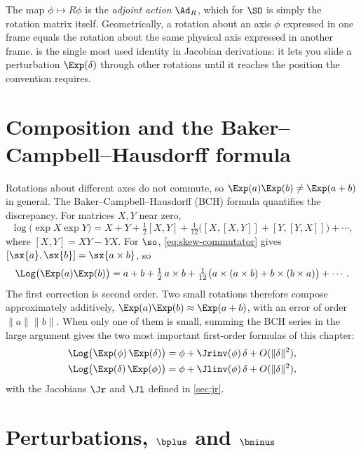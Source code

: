 The map $\phi \mapsto R\phi$ is the \emph{adjoint action} $\Ad_R$, which for $\SO$ is simply the rotation
matrix itself. Geometrically, a rotation about an axis $\phi$ expressed in one frame equals the rotation
about the same physical axis expressed in another frame.  is the single most used identity
in Jacobian derivations: it lets you slide a perturbation $\Exp(\delta)$ through other rotations until
it reaches the position the convention requires.

\section{Composition and the Baker--Campbell--Hausdorff formula}

Rotations about different axes do not commute, so $\Exp(a)\Exp(b) \neq \Exp(a + b)$ in general. The
Baker--Campbell--Hausdorff (BCH) formula quantifies the discrepancy. For matrices $X, Y$ near zero,
\begin{equation}
  \log\big(\exp X \exp Y\big) = X + Y + \tfrac12[X, Y] + \tfrac1{12}\big([X,[X,Y]] + [Y,[Y,X]]\big) + \cdots,
\end{equation}
where $[X, Y] = XY - YX$. For $\so$, \eqref{eq:skew-commutator} gives $[\sx{a}, \sx{b}] = \sx{a\times b}$, so
\begin{equation}
  \Log\big(\Exp(a)\Exp(b)\big) = a + b + \tfrac12\, a\times b
     + \tfrac1{12}\big( a\times(a\times b) + b\times(b\times a)\big) + \cdots .
  \label{eq:bch}
\end{equation}
The first correction is second order. Two small rotations therefore compose approximately additively,
$\Exp(a)\Exp(b) \approx \Exp(a + b)$, with an error of order $\|a\|\|b\|$. When only one of them is small,
summing the BCH series in the large argument gives the two most important first-order formulas of
this chapter:
\begin{align}
  \Log\big(\Exp(\phi)\,\Exp(\delta)\big) &= \phi + \Jrinv(\phi)\,\delta + O(\|\delta\|^2), \label{eq:bch-right}\\
  \Log\big(\Exp(\delta)\,\Exp(\phi)\big) &= \phi + \Jlinv(\phi)\,\delta + O(\|\delta\|^2), \label{eq:bch-left}
\end{align}
with the Jacobians $\Jr$ and $\Jl$ defined in \cref{sec:jr}.

\section{Perturbations, \texorpdfstring{$\bplus$}{boxplus} and \texorpdfstring{$\bminus$}{boxminus}}
\label{sec:perturbations}
\label{sec:boxplus}

